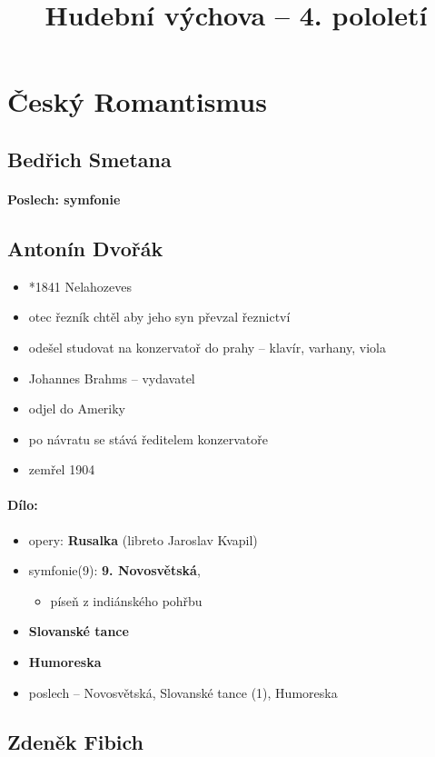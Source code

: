 \title{Hudební výchova -- 4. pololetí}


\section{Český Romantismus}
\subsection{Bedřich Smetana}
\paragraph{Poslech: symfonie}


\subsection{Antonín Dvořák}
\begin{itemize}
\item *1841 Nelahozeves
\item otec řezník \ra chtěl aby jeho syn převzal řeznictví
\item odešel studovat na konzervatoř do prahy -- klavír, varhany, viola
\item Johannes Brahms -- vydavatel
\item odjel do Ameriky
\item po návratu se stává ředitelem konzervatoře
\item zemřel 1904
\end{itemize}

\paragraph{Dílo:}
\begin{itemize}
\item opery: \textbf{Rusalka} (libreto Jaroslav Kvapil)
\item symfonie(9): \textbf{9. Novosvětská}, 
	\begin{itemize}
	\item píseň z indiánského pohřbu
	\end{itemize}
\item \textbf{Slovanské tance}
\item \textbf{Humoreska}
\item poslech -- Novosvětská, Slovanské tance (1), Humoreska
\end{itemize}

\subsection{Zdeněk Fibich}
